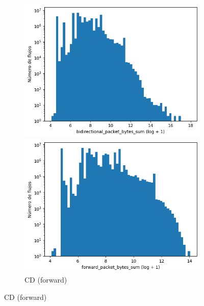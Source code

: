 \begin{figure}[H]
    \centering
    \hfill
    \begin{subfigure}[b]{0.26\textwidth}
        \centering
        \includegraphics[width=\textwidth]{media/packet_pincer_cicddos/bidirectional_packet_bytes_sum_log_x_log_y.png}
        \caption{CD (bidir.)}
        \includegraphics[width=\textwidth]{media/packet_pincer_cicddos/forward_packet_bytes_sum_log_x_log_y.png}
        \caption{CD (forward)}

\end{subfigure}
\end{figure}

